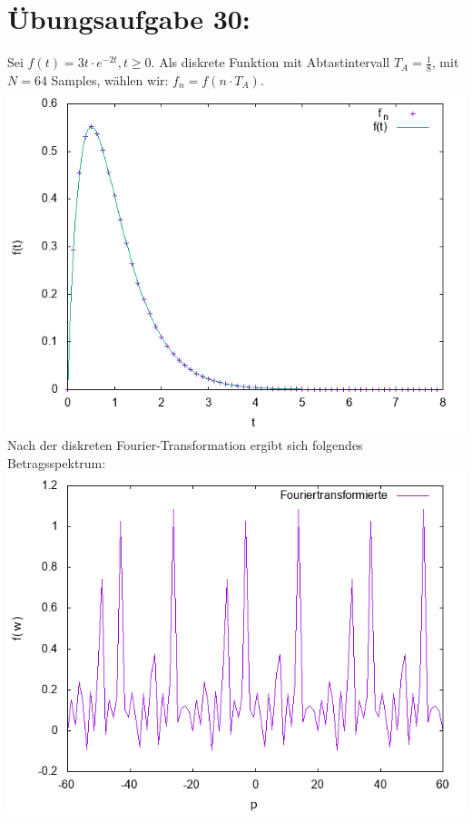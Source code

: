 

	\section*{Übungsaufgabe 30:}
		Sei $f(t) = 3t\cdot e^{-2t}, t\ge 0$.
        Als diskrete Funktion mit Abtastintervall $T_A = \frac{1}{8}$, mit $N = 64$ Samples, wählen wir: $f_n = f(n \cdot T_A)$. \\
        \includegraphics[width=\textwidth]{A30_Fn.png} \\
        Nach der diskreten Fourier-Transformation ergibt sich folgendes Betragsspektrum: \\
        \includegraphics[width=\textwidth]{A30_Abs.png}

